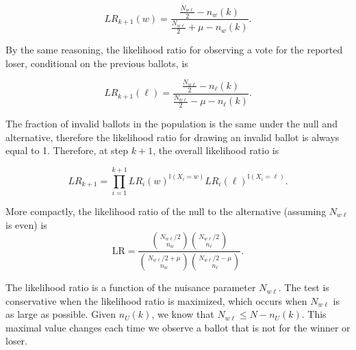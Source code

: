 \documentclass[12pt]{article}
\newcommand{\beq}{\begin{equation}}
\newcommand{\eeq}{\end{equation}}
\begin{document}
$$LR_{k+1}(w) = \frac{\frac{N_{w\ell}}{2} - n_w(k)}{\frac{N_{w\ell}}{2}+\mu - n_w(k)}.$$

By the same reasoning, the likelihood ratio for observing a vote for the reported loser, conditional on the previous ballots, is

$$LR_{k+1}(\ell) = \frac{\frac{N_{w\ell}}{2} - n_\ell(k)}{\frac{N_{w\ell}}{2}-\mu - n_\ell(k)}.$$

The fraction of invalid ballots in the population is the same under the null and alternative, therefore the likelihood ratio for drawing an invalid ballot is always equal to 1. Therefore, at step $k+1$, the overall likelihood ratio is

$$LR_{k+1} = \prod_{i=1}^{k+1} LR_i(w)^{\mathbb{I}(X_i= w)}LR_i(\ell)^{\mathbb{I}(X_i = \ell)}.$$

More compactly, the likelihood ratio of the null to the alternative (assuming $N_{w\ell}$ is even) is
\beq
   \mbox{LR} = \frac{ {N_{w\ell}/2 \choose n_w}{N_{w\ell}/2 \choose n_\ell}}
           {{N_{w\ell}/2+\mu \choose n_w}{N_{w\ell}/2-\mu \choose n_\ell}}.
\eeq

The likelihood ratio is a function of the nuisance parameter $N_{w\ell}$.
The test is conservative when the likelihood ratio is maximized, which occurs when $N_{w\ell}$ is as large as possible. 
Given $n_U(k)$, we know that $N_{w\ell} \leq N - n_U(k)$.
This maximal value changes each time we observe a ballot that is not for the winner or loser.






\end{document}
